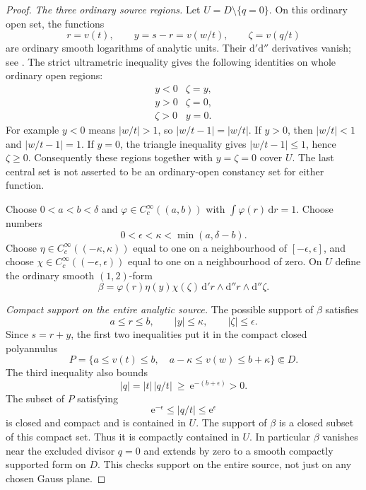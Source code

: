 \begin{proof}
\emph{The three ordinary source regions.}
Let \(U=D\setminus\{q=0\}\). On this ordinary open set,
the functions
\[
 r=v(t),\qquad y=s-r=v(w/t),\qquad
 \zeta=v(q/t)
\]
are ordinary smooth logarithms of analytic units.
Their \(\mathrm d'\mathrm d''\) derivatives vanish;
see \cite[Section 18.1.2, p.~501]{CLD25}.
The strict ultrametric inequality gives the following
identities on whole ordinary open regions:
\begin{equation}
 \label{eq:p213-mixed-star}
 \begin{array}{c|c}
 y<0 & \zeta=y,\\
 y>0 & \zeta=0,\\
 \zeta>0 & y=0 .
 \end{array}
\end{equation}
For example \(y<0\) means \(|w/t|>1\), so
\(|w/t-1|=|w/t|\). If \(y>0\), then
\(|w/t|<1\) and \(|w/t-1|=1\).
If \(y=0\), the triangle inequality gives
\(|w/t-1|\leq1\), hence \(\zeta\geq0\).
Consequently these regions together with \(y=\zeta=0\)
cover \(U\). The last central set is not asserted to
be an ordinary-open constancy set for either function.

Choose \(0<a<b<\delta\) and
\(\varphi\in C_c^\infty((a,b))\) with
\(\int\varphi(r)\,\mathrm dr=1\). Choose numbers
\[
          0<\epsilon<\kappa<
                      \min(a,\delta-b).
\]
Choose \(\eta\in C_c^\infty((-\kappa,\kappa))\)
equal to one on a neighbourhood of
\([-\epsilon,\epsilon]\), and choose
\(\chi\in C_c^\infty((-\epsilon,\epsilon))\)
equal to one on a neighbourhood of zero.
On \(U\) define the ordinary smooth \((1,2)\)-form
\[
 \beta=\varphi(r)\eta(y)\chi(\zeta)\,
           \mathrm d'r\wedge\mathrm d''r\wedge\mathrm d''\zeta.
\]

\emph{Compact support on the entire analytic source.}
The possible support of \(\beta\) satisfies
\[
 a\leq r\leq b,\qquad |y|\leq\kappa,\qquad
 |\zeta|\leq\epsilon .
\]
Since \(s=r+y\), the first two inequalities put it in the
compact closed polyannulus
\[
 P=\{a\leq v(t)\leq b,\quad
                a-\kappa\leq v(w)\leq b+\kappa\}
       \Subset D.
\]
The third inequality also bounds
\[
 |q|=|t|\,|q/t|\ \geq\ \mathrm e^{-(b+\epsilon)}>0.
\]
The subset of \(P\) satisfying
\[
       \mathrm e^{-\epsilon}\leq |q/t|
                                     \leq\mathrm e^\epsilon
\]
is closed and compact and is contained in \(U\).
The support of \(\beta\) is a closed subset of this compact
set. Thus it is compactly contained in \(U\).
In particular \(\beta\) vanishes near the excluded divisor
\(q=0\) and extends by zero to a smooth compactly supported
form on \(D\). This checks support on the entire source,
not just on any chosen Gauss plane.


\end{proof}
